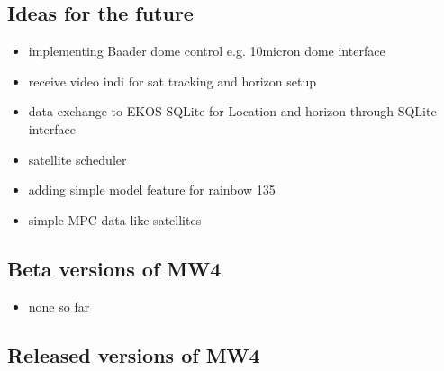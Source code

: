\documentclass[a4paper,10pt,english]{sphinxmanual}
\begin{document}
\sphinxstepscope


\subsection{Ideas for the future}
\label{\detokenize{changelog/features:ideas-for-the-future}}\label{\detokenize{changelog/features::doc}}\begin{itemize}
\item {} 
\sphinxAtStartPar
implementing Baader dome control e.g. 10micron dome interface

\item {} 
\sphinxAtStartPar
receive video indi for sat tracking and horizon setup

\item {} 
\sphinxAtStartPar
data exchange to EKOS SQLite for Location and horizon through SQLite interface

\item {} 
\sphinxAtStartPar
satellite scheduler

\item {} 
\sphinxAtStartPar
adding simple model feature for rainbow 135

\item {} 
\sphinxAtStartPar
simple MPC data like satellites

\end{itemize}

\sphinxstepscope


\subsection{Beta versions of MW4}
\label{\detokenize{changelog/changelog:beta-versions-of-mw4}}\label{\detokenize{changelog/changelog::doc}}\begin{itemize}
\item {} 
\sphinxAtStartPar
none so far

\end{itemize}


\subsection{Released versions of MW4}
\label{\detokenize{changelog/changelog:released-versions-of-mw4}}
\end{document}
